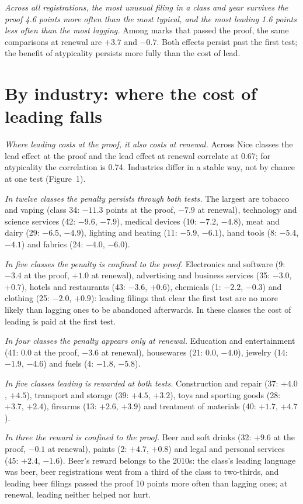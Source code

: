 \emph{Across all registrations, the most unusual filing in a class and
year survives the proof 4.6 points more often than the most typical, and
the most leading 1.6 points less often than the most lagging.} Among
marks that passed the proof, the same comparisons at renewal are $+3.7$
and $-0.7$. Both effects persist past the first test; the benefit of
atypicality persists more fully than the cost of lead.

\section*{By industry: where the cost of leading falls}

\emph{Where leading costs at the proof, it also costs at renewal.} Across
Nice classes the lead effect at the proof and the lead effect at renewal
correlate at 0.67; for atypicality the correlation is 0.74. Industries
differ in a stable way, not by chance at one test (Figure~1).

\emph{In twelve classes the penalty persists through both tests.} The
largest are tobacco and vaping (class 34: $-11.3$ points at the proof,
$-7.9$ at renewal), technology and science services (42: $-9.6$,
$-7.9$), medical devices (10: $-7.2$, $-4.8$), meat and dairy (29:
$-6.5$, $-4.9$), lighting and heating (11: $-5.9$, $-6.1$), hand tools
(8: $-5.4$, $-4.1$) and fabrics (24: $-4.0$, $-6.0$).

\emph{In five classes the penalty is confined to the proof.} Electronics
and software (9: $-3.4$ at the proof, $+1.0$ at renewal), advertising and
business services (35: $-3.0$, $+0.7$), hotels and restaurants (43:
$-3.6$, $+0.6$), chemicals (1: $-2.2$, $-0.3$) and clothing (25: $-2.0$,
$+0.9$): leading filings that clear the first test are no more likely
than lagging ones to be abandoned afterwards. In these classes the cost
of leading is paid at the first test.

\emph{In four classes the penalty appears only at renewal.} Education
and entertainment (41: 0.0 at the proof, $-3.6$ at renewal), housewares
(21: 0.0, $-4.0$), jewelry (14: $-1.9$, $-4.6$) and fuels (4: $-1.8$,
$-5.8$).

\emph{In five classes leading is rewarded at both tests.} Construction
and repair (37: $+4.0$, $+4.5$), transport and storage (39: $+4.5$,
$+3.2$), toys and sporting goods (28: $+3.7$, $+2.4$), firearms (13:
$+2.6$, $+3.9$) and treatment of materials (40: $+1.7$, $+4.7$).

\emph{In three the reward is confined to the proof.} Beer and soft drinks
(32: $+9.6$ at the proof, $-0.1$ at renewal), paints (2: $+4.7$, $+0.8$)
and legal and personal services (45: $+2.4$, $-1.6$). Beer's reward
belongs to the 2010s: the class's leading language was beer, beer
registrations went from a third of the class to two-thirds, and leading
beer filings passed the proof 10 points more often than lagging ones;
at renewal, leading neither helped nor hurt.

